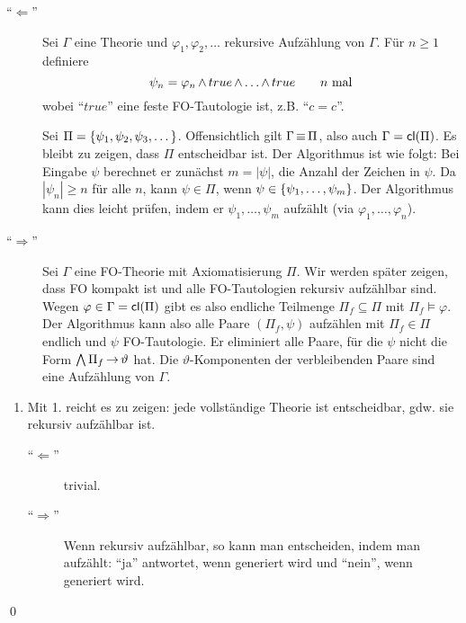 \begin{description}
  \item[\enquote{$\Leftarrow$}]
  Sei $\Gamma$ eine Theorie und $\varphi_1, \varphi_2, \ldots$ rekursive
  Aufzählung von $\Gamma$.
  Für $n\geq1$ definiere
  \[
    \psi_n = \varphi_n \operatorname{\wedge} true \operatorname{\wedge} \dots \operatorname{\wedge} true \qquad \text{$n$ mal}
  \]
  wobei \enquote{$true$} eine feste FO-Tautologie ist, z.B. \enquote{$c=c$}.
  
  Sei $\Pi=\left\{\psi_1,\psi_2,\psi_3,\dots\right\}$. Offensichtlich gilt
  $\Gamma\operatorname{\equiv}\Pi$, also auch $\Gamma=\operatorname{\text{\textsf{cl}}}(\Pi)$. Es bleibt zu zeigen, dass $\Pi$
  entscheidbar ist. Der Algorithmus ist wie folgt: Bei Eingabe $\psi$
  berechnet er zunächst $m=|\psi|$, die Anzahl der Zeichen in $\psi$. Da
  $|\psi_n| \geq n$ für alle $n$, kann $\psi\in\Pi$, wenn
  $\psi\in\left\{\psi_1,\dots,\psi_m\right\}$. Der Algorithmus kann dies leicht prüfen,
  indem er $\psi_1,\dots,\psi_m$ aufzählt (via $\varphi_1,\dots,\varphi_n$).
    
  \item[\enquote{$\Rightarrow$}]
  Sei $\Gamma$ eine FO-Theorie mit Axiomatisierung $\Pi$. Wir werden später
  zeigen, dass FO kompakt ist und alle FO-Tautologien rekursiv aufzählbar
  sind. Wegen $\varphi\in\Gamma=\operatorname{\text{\textsf{cl}}}(\Pi)$ gibt es also endliche Teilmenge
  $\Pi_f\subseteq\Pi$ mit $\Pi_f\models\varphi$. Der Algorithmus kann also
  alle Paare $(\Pi_f,\psi)$ aufzählen mit $\Pi_f\in\Pi$ endlich und $\psi$
  FO-Tautologie. Er eliminiert alle Paare, für die $\psi$ nicht die Form
  $\operatorname*{\bigwedge}\Pi_f\operatorname{\rightarrow}\vartheta$ hat. Die $\vartheta$-Komponenten der verbleibenden Paare
  sind eine Aufzählung von $\Gamma$.
\end{description}

\begin{enumerate}[start=2]%
  \item Mit 1. reicht es zu zeigen: jede vollständige Theorie \Gamma ist entscheidbar, gdw. sie rekursiv aufzählbar ist.
  \begin{description}
    \item[\enquote{$\Leftarrow$}] trivial.
    \item[\enquote{$\Rightarrow$}]
    Wenn \Gamma rekursiv aufzählbar, so kann man \varphi{}\Gamma entscheiden, indem man \Gamma aufzählt:
    \enquote{ja} antwortet, wenn \varphi generiert wird und \enquote{nein}, wenn \NOT\varphi generiert wird.
  \end{description}
\end{enumerate}
\qed
